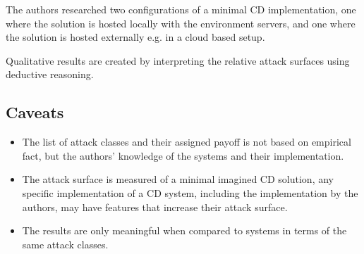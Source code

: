 The authors researched two configurations of a minimal \acrshort{CD} implementation, one where the solution is hosted locally with the environment servers, and one where the solution is hosted externally e.g. in a cloud based setup.

Qualitative results are created by interpreting the relative attack surfaces using deductive reasoning.

\subsection{Caveats}
\begin{itemize}
    \item The list of attack classes and their assigned payoff is not based on empirical fact, but the authors' knowledge of the systems and their implementation.
    \item The attack surface is measured of a minimal imagined \acrshort{CD} solution, any specific implementation of a \acrshort{CD} system, including the implementation by the authors, may have features that increase their attack surface.
    \item The results are only meaningful when compared to systems in terms of the same attack classes.
\end{itemize}